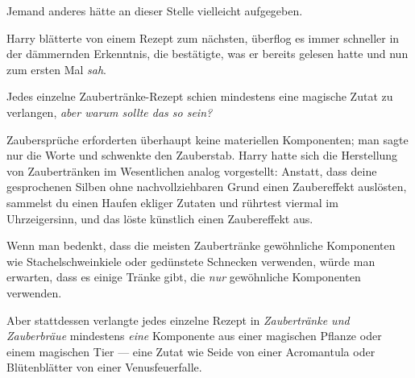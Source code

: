 Jemand anderes hätte an dieser Stelle vielleicht aufgegeben.

Harry blätterte von einem Rezept zum nächsten, überflog es immer schneller in der dämmernden Erkenntnis, die bestätigte, was er bereits gelesen hatte und nun zum ersten Mal \emph{sah}.

Jedes einzelne Zaubertränke-Rezept schien mindestens eine magische Zutat zu verlangen, \emph{aber warum sollte das so sein?}

Zaubersprüche erforderten überhaupt keine materiellen Komponenten; man sagte nur die Worte und schwenkte den Zauberstab. Harry hatte sich die Herstellung von Zaubertränken im Wesentlichen analog vorgestellt: Anstatt, dass deine gesprochenen Silben ohne nachvollziehbaren Grund einen Zaubereffekt auslösten, sammelst du einen Haufen ekliger Zutaten und rührtest viermal im Uhrzeigersinn, und das löste künstlich einen Zaubereffekt aus.

Wenn man bedenkt, dass die meisten Zaubertränke gewöhnliche Komponenten wie Stachelschweinkiele oder gedünstete Schnecken verwenden, würde man erwarten, dass es einige Tränke gibt, die \emph{nur} gewöhnliche Komponenten verwenden.

Aber stattdessen verlangte jedes einzelne Rezept in \emph{Zaubertränke und Zauberbräue} mindestens \emph{eine} Komponente aus einer magischen Pflanze oder einem magischen Tier — eine Zutat wie Seide von einer Acromantula oder Blütenblätter von einer Venusfeuerfalle.

